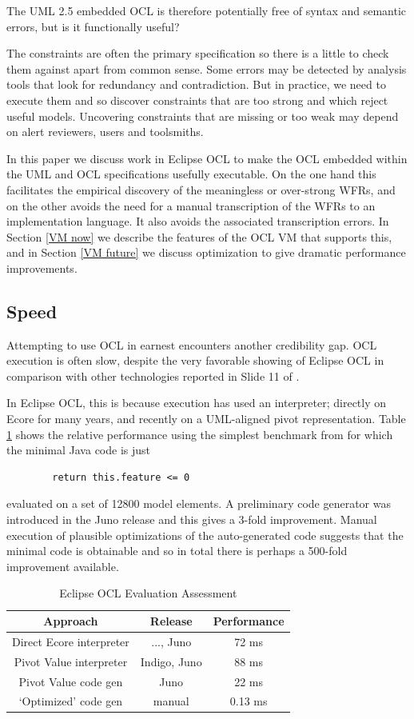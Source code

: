 \documentclass{acm_proc_article-sp}
\begin{document}
The UML 2.5 embedded OCL is therefore potentially free of syntax and semantic errors, but is it functionally useful?

The constraints are often the primary specification so there is a little to check them against apart from common sense.
Some errors may be detected by analysis tools that look for redundancy and contradiction. But in practice, we need to
execute them and so discover constraints that are too strong and which reject useful models. Uncovering constraints
that are missing or too weak may depend on alert reviewers, users and toolsmiths.

In this paper we discuss work in Eclipse OCL to make the OCL embedded within the UML and OCL specifications usefully
executable. On the one hand this facilitates the empirical discovery of the meaningless or over-strong WFRs, and on the other avoids the need for a manual transcription of the WFRs to an implementation language. It also avoids the associated transcription errors. In Section \ref{VM now} we describe the features of the OCL VM that supports this, and in Section \ref{VM future} we discuss optimization to give dramatic performance improvements. 

\subsection{Speed}
Attempting to use OCL in earnest encounters another credibility gap. OCL execution is often slow, despite the very favorable showing of Eclipse OCL in comparison with other technologies reported in Slide 11 of \cite{Rath-Queries}.

In Eclipse OCL, this is because execution has used an interpreter; directly on Ecore for many years, and recently
on a UML-aligned pivot representation. Table \ref{Evaluator performance} shows the relative performance using the simplest benchmark from \cite{Rath-Queries} for which the minimal Java code is just
\begin{verbatim}        return this.feature <= 0\end{verbatim}
 evaluated on a set of 12800 model elements.
A preliminary code generator was introduced in the Juno release and this gives a 3-fold
improvement. Manual execution of plausible optimizations of the auto-generated code suggests that the minimal code is obtainable and so in total there is perhaps a 500-fold improvement available. 

\begin{table}
\centering
\caption{Eclipse OCL Evaluation Assessment}\label{Evaluator performance}
\begin{tabular}{|c|c|c|} \hline
Approach&Release&Performance\\ \hline
Direct Ecore interpreter & ..., Juno & 72 ms\\ \hline
Pivot Value interpreter & Indigo, Juno & 88 ms \\ \hline
Pivot Value code gen & Juno & 22 ms \\ \hline
`Optimized' code gen & manual & 0.13 ms \\ \hline
\end{tabular}
\end{table}
\end{document}
